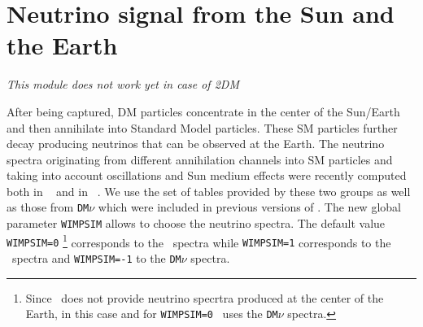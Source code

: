 \documentclass[12pt,a4paper]{article}
\begin{document}


\section{Neutrino signal from the Sun and the Earth }
\label{sec:neutrino}

\begin{center}
{\it This module
does not work yet in case of 2DM}
\end{center}

After being captured, DM particles concentrate in the center of the Sun/Earth and 
then  annihilate into Standard Model particles. These SM particles further decay producing neutrinos that can be 
observed at the Earth.  The neutrino spectra originating from
different annihilation channels into SM particles and
taking into account oscillations  and Sun medium effects were 
recently  computed both in
\wimpsim~\cite{Blennow:2007tw} and in 
\pppc~\cite{Baratella:2013fya}. We use the set of tables
provided by these two groups as well as  those from  {\tt DM$\nu$}
\cite{Cirelli:2005gh}  which were included in previous versions of \micro.
The new global parameter {\tt WIMPSIM}  allows to
choose  the   neutrino spectra. The default value  {\tt WIMPSIM=0} \footnote{Since \pppc\ does not provide neutrino specrtra produced at the center of the
Earth, in this case  and for {\tt WIMPSIM=0} \micro\ uses the {\tt DM$\nu$} spectra.}
corresponds to the \pppc\ spectra while  {\tt WIMPSIM=1} corresponds to the
\wimpsim\  spectra and  {\tt WIMPSIM=-1}  to the 
 {\tt DM$\nu$} spectra. 
  
\end{document}
